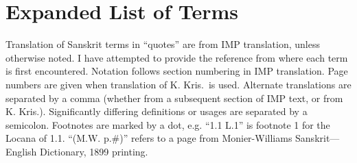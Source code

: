 \documentclass[10pt]{article}
\begin{document}
\newpage


\section{Expanded List of Terms}

Translation of Sanskrit terms in ``quotes'' are from IMP translation, unless otherwise noted.
I have attempted to provide the reference from where each term is first encountered.
Notation follows section numbering in IMP translation. Page numbers are given when translation of K. Kris.\ is used.
Alternate translations are separated by a comma (whether from a subsequent section of IMP text, or from K. Kris.).
Significantly differing definitions or usages are separated by a semicolon.
Footnotes are marked by a dot, e.g. ``1.1 L.1'' is footnote 1 for the Locana of 1.1.
``(M.W. p.\#)'' refers to a page from Monier-Williams Sanskrit---English Dictionary, 1899 printing.



\newcommand\litem[1]{\item{\bfseries #1\label{#1}}}
\end{document}

